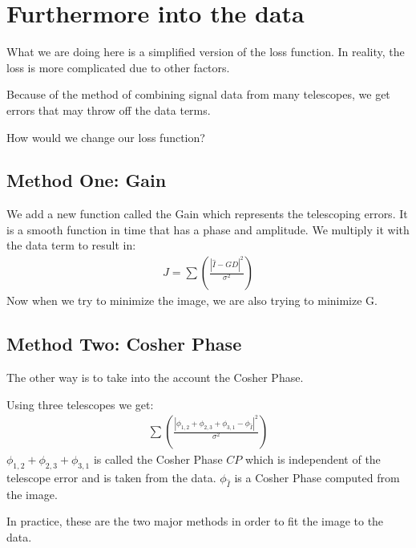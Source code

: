 \documentclass[letterpaper,10pt,english]{jupyterBook}
\begin{document}
\section{Furthermore into the data}
\label{\detokenize{loss:furthermore-into-the-data}}
\sphinxAtStartPar
What we are doing here is a simplified version of the loss function. In reality, the loss is more complicated due to other factors.

\sphinxAtStartPar
Because of the method of combining signal data from many telescopes, we get errors that may throw off the data terms.

\sphinxAtStartPar
How would we change our loss function?


\subsection{Method One: Gain}
\label{\detokenize{loss:method-one-gain}}
\sphinxAtStartPar
We add a new function called the Gain which represents the telescoping errors. It is a smooth function in time that has a phase and amplitude. We multiply it with the data term to result in:
\begin{equation*}
\begin{split}J = \sum(\frac{|\hat{I} - G D|^2}{\sigma^2})\end{split}
\end{equation*}
\sphinxAtStartPar
Now when we try to minimize the image, we are also trying to minimize G.


\subsection{Method Two: Cosher Phase}
\label{\detokenize{loss:method-two-cosher-phase}}
\sphinxAtStartPar
The other way is to take into the account the Cosher Phase.

\sphinxAtStartPar
Using three telescopes we get:
\begin{equation*}
\begin{split} \sum (\frac{|\phi_{1,2} + \phi_{2,3} + \phi_{3,1} - \phi_{\hat{I}}|^2}{\sigma^2})\end{split}
\end{equation*}
\sphinxAtStartPar
\(\phi_{1,2} + \phi_{2,3} + \phi_{3,1}\) is called the Cosher Phase \(CP\) which is independent of the telescope error and is taken from the data. \(\phi_{\hat{I}}\) is a Cosher Phase computed from the image.

\sphinxAtStartPar
In practice, these are the two major methods in order to fit the image to the data.
\end{document}
